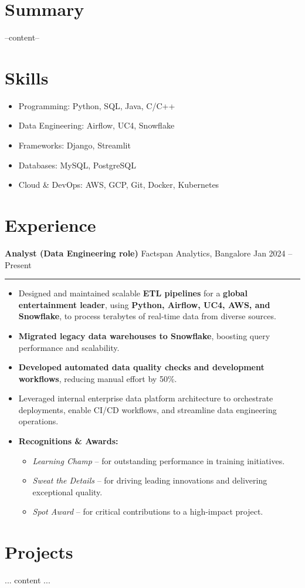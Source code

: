


\section*{Summary}
--content--
\section*{Skills}
\begin{itemize}
    \item Programming: Python, SQL, Java, C/C++
    \item Data Engineering: Airflow, UC4, Snowflake
    \item Frameworks: Django, Streamlit
    \item Databases: MySQL, PostgreSQL
    \item Cloud \& DevOps: AWS, GCP, Git, Docker, Kubernetes
\end{itemize}

\section*{Experience}
\textbf{Analyst (Data Engineering role)} \hfill Factspan Analytics, Bangalore \hfill Jan 2024 – Present\vspace{0.2cm}
\hrule
\vspace{0.2cm}
\begin{itemize}
    \item Designed and maintained scalable \textbf{ETL pipelines} for a \textbf{global entertainment leader}, using \textbf{Python, Airflow, UC4, AWS, and Snowflake}, to process terabytes of real-time data from diverse sources.
    \item \textbf{Migrated legacy data warehouses to Snowflake}, boosting query performance and scalability.
    \item \textbf{Developed automated data quality checks and development workflows}, reducing manual effort by 50\%.
    \item Leveraged internal enterprise data platform architecture to orchestrate deployments, enable CI/CD workflows, and streamline data engineering operations.
    \item \textbf{Recognitions \& Awards:}
    \begin{itemize}
        \item \textit{Learning Champ} – for outstanding performance in training initiatives.
        \item \textit{Sweat the Details} – for driving leading innovations and delivering exceptional quality.
        \item \textit{Spot Award} – for critical contributions to a high-impact project.
    \end{itemize}
\end{itemize}

\section*{Projects}
... content ...



